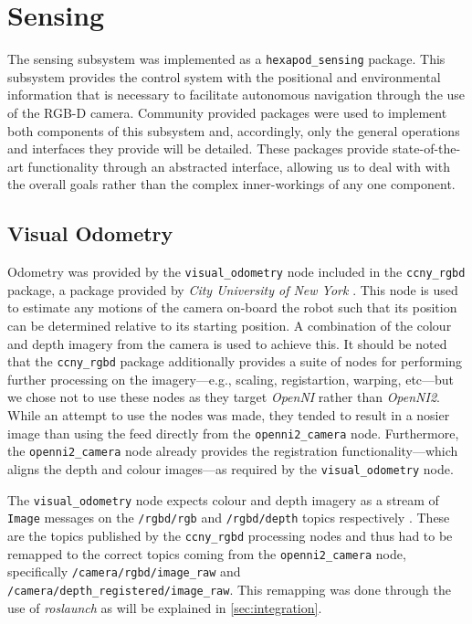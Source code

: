 
\section{Sensing}

The sensing subsystem was implemented as a \texttt{hexapod\_sensing} package. This subsystem provides the control system with the positional and environmental information that is necessary to facilitate autonomous navigation through the use of the RGB-D camera. Community provided packages were used to implement both components of this subsystem and, accordingly, only the general operations and interfaces they provide will be detailed. These packages provide state-of-the-art functionality through an abstracted interface, allowing us to deal with with the overall goals rather than the complex inner-workings of any one component.

\subsection{Visual Odometry}

Odometry was provided by the \texttt{visual\_odometry} node included in the \texttt{ccny\_rgbd} package, a package provided by \emph{City University of New York} \cite{ccny_rgbd}. This node is used to estimate any motions of the camera on-board the robot such that its position can be determined relative to its starting position. A combination of the colour and depth imagery from the camera is used to achieve this. It should be noted that the \texttt{ccny\_rgbd} package additionally provides a suite of nodes for performing further processing on the imagery---e.g., scaling, registartion, warping, etc---but we chose not to use these nodes as they target \emph{OpenNI} rather than \emph{OpenNI2}. While an attempt to use the nodes was made, they tended to result in a nosier image than using the feed directly from the \texttt{openni2\_camera} node. Furthermore, the \texttt{openni2\_camera} node already provides the registration functionality---which aligns the depth and colour images---as required by the \texttt{visual\_odometry} node.

The \texttt{visual\_odometry} node expects colour and depth imagery as a stream of \texttt{Image} messages on the \texttt{/rgbd/rgb} and \texttt{/rgbd/depth} topics respectively \cite{ccny_rgbd_vo}. These are the topics published by the \texttt{ccny\_rgbd} processing nodes and thus had to be remapped to the correct topics coming from the \texttt{openni2\_camera} node, specifically \texttt{/camera/rgbd/image\_raw} and \texttt{/camera/depth\_registered/image\_raw}. This remapping was done through the use of \emph{roslaunch} as will be explained in \autoref{sec:integration}.

